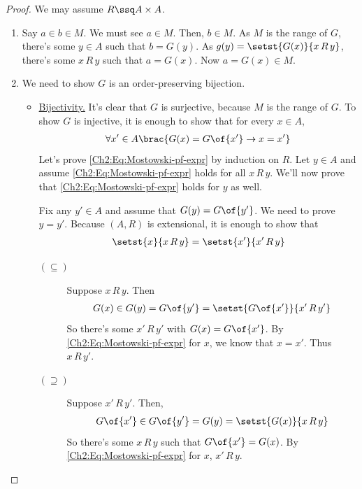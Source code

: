 \begin{proof}
    We may assume $R \ssq A \times A$.

    \begin{enumerate}
        \item Say $a \in b \in M$. We must see $a \in M$. Then, $b \in M$. As $M$ is the range of $G$, there's some $y \in  A$ such that $b = G(y)$. As $g(y) = \setst{G(x)}{x \, R \, y}$, there's some $x \, R \, y$ such that $a = G(x)$. Now $a = G(x) \in M$.

        \item We need to show $G$ is an order-preserving bijection.
        
        \begin{itemize}
            \item \underline{Bijectivity.} It's clear that $G$ is surjective, because $M$ is the range of $G$. To show $G$ is injective, it is enough to show that for every $x \in  A$,
            \begin{align}
                \forall x' \in A \brac{G(x) = G\of{x'} \to x = x'}
                \label{Ch2:Eq:Mostowski-pf-expr}
            \end{align}
            Let's prove \eqref{Ch2:Eq:Mostowski-pf-expr} by induction on $R$. Let $y \in A$ and assume \eqref{Ch2:Eq:Mostowski-pf-expr} holds for all $x \, R \, y$. We'll now prove that \eqref{Ch2:Eq:Mostowski-pf-expr} holds for $y$ as well.
    
            Fix any $y' \in A$ and assume that $G(y) = G\of{y'}$. We need to prove $y = y'$. Because $(A, R)$ is extensional, it is enough to show that
            \begin{align*}
                \setst{x}{x \, R \, y} = \setst{x'}{x' \, R \, y}
            \end{align*}
            \begin{description}
                \item[$(\subseteq)$]
                    Suppose $x \, R \, y$. Then
                    \begin{align*}
                        G(x) \in G(y) = G\of{y'} = \setst{G\of{x'}}{x' \, R \, y'}
                    \end{align*}
                    So there's some $x' \, R \, y'$ with $G(x) = G\of{x'}$. By \eqref{Ch2:Eq:Mostowski-pf-expr} for $x$, we know that $x = x'$. Thus $x \, R \, y'$.
    
                \item[$(\supseteq)$]
                    Suppose $x' \, R \, y'$. Then,
                    \begin{align*}
                        G\of{x'} \in G\of{y'} = G(y) = \setst{G(x)}{x \, R \, y}
                    \end{align*}
                    So there's some $x \, R \, y$ such that $G\of{x'} = G(x)$. By \eqref{Ch2:Eq:Mostowski-pf-expr} for $x$, $x' \, R \, y$.
            \end{description}


\end{itemize}
\end{enumerate}
\end{proof}
